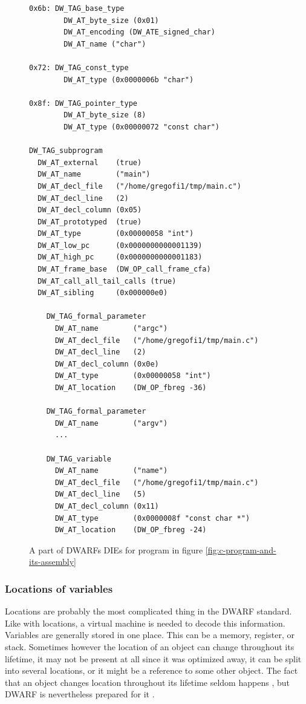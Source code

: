\begin{figure}
    \begin{lstlisting}
0x6b: DW_TAG_base_type
        DW_AT_byte_size (0x01)
        DW_AT_encoding (DW_ATE_signed_char)
        DW_AT_name ("char")

0x72: DW_TAG_const_type
        DW_AT_type (0x0000006b "char")

0x8f: DW_TAG_pointer_type
        DW_AT_byte_size	(8)
        DW_AT_type (0x00000072 "const char")

DW_TAG_subprogram
  DW_AT_external	(true)
  DW_AT_name	    ("main")
  DW_AT_decl_file	("/home/gregofi1/tmp/main.c")
  DW_AT_decl_line	(2)
  DW_AT_decl_column	(0x05)
  DW_AT_prototyped	(true)
  DW_AT_type        (0x00000058 "int")
  DW_AT_low_pc      (0x0000000000001139)
  DW_AT_high_pc	    (0x0000000000001183)
  DW_AT_frame_base	(DW_OP_call_frame_cfa)
  DW_AT_call_all_tail_calls	(true)
  DW_AT_sibling	    (0x000000e0)

    DW_TAG_formal_parameter
      DW_AT_name	    ("argc")
      DW_AT_decl_file	("/home/gregofi1/tmp/main.c")
      DW_AT_decl_line	(2)
      DW_AT_decl_column	(0x0e)
      DW_AT_type	    (0x00000058 "int")
      DW_AT_location	(DW_OP_fbreg -36)

    DW_TAG_formal_parameter
      DW_AT_name	    ("argv")
      ...

    DW_TAG_variable
      DW_AT_name	    ("name")
      DW_AT_decl_file	("/home/gregofi1/tmp/main.c")
      DW_AT_decl_line	(5)
      DW_AT_decl_column	(0x11)
      DW_AT_type	    (0x0000008f "const char *")
      DW_AT_location	(DW_OP_fbreg -24)
    \end{lstlisting}
    \caption{A part of DWARFs DIEs for program in figure \ref{fig:c-program-and-its-assembly}}
    \label{fig:dwarf-die}
\end{figure}

\subsubsection{Locations of variables}\label{section:dwarf-location}
Locations are probably the most complicated thing in the DWARF standard. Like
with locations, a virtual machine is needed to decode this information.
Variables are generally stored in one place. This can be a memory, register, or
stack. Sometimes however the location of an object can change throughout its
lifetime, it may not be present at all since it was optimized away, it can be
split into several locations, or it might be a reference to some other object.
The fact that an object changes location throughout its lifetime seldom happens
\cite{dwarf-intro}, but DWARF is nevertheless prepared for it \cite{dwarf}.

